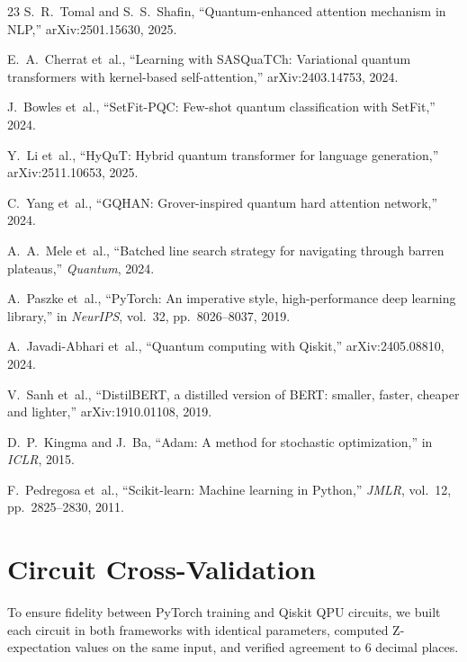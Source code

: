 \documentclass[conference,onecolumn,11pt]{IEEEtran}
\begin{document}
\begin{thebibliography}{23}
S.~R.~Tomal and S.~S.~Shafin, ``Quantum-enhanced attention mechanism in NLP,'' arXiv:2501.15630, 2025.

E.~A.~Cherrat et~al., ``Learning with SASQuaTCh: Variational quantum transformers with kernel-based self-attention,'' arXiv:2403.14753, 2024.

J.~Bowles et~al., ``SetFit-PQC: Few-shot quantum classification with SetFit,'' 2024.

Y.~Li et~al., ``HyQuT: Hybrid quantum transformer for language generation,'' arXiv:2511.10653, 2025.

C.~Yang et~al., ``GQHAN: Grover-inspired quantum hard attention network,'' 2024.

A.~A.~Mele et~al., ``Batched line search strategy for navigating through barren plateaus,'' \emph{Quantum}, 2024.

A.~Paszke et~al., ``PyTorch: An imperative style, high-performance deep learning library,'' in \emph{NeurIPS}, vol.~32, pp.~8026--8037, 2019.

A.~Javadi-Abhari et~al., ``Quantum computing with Qiskit,'' arXiv:2405.08810, 2024.

V.~Sanh et~al., ``DistilBERT, a distilled version of BERT: smaller, faster, cheaper and lighter,'' arXiv:1910.01108, 2019.

D.~P.~Kingma and J.~Ba, ``Adam: A method for stochastic optimization,'' in \emph{ICLR}, 2015.

F.~Pedregosa et~al., ``Scikit-learn: Machine learning in Python,'' \emph{JMLR}, vol.~12, pp.~2825--2830, 2011.

\end{thebibliography}

\appendix

\section{Circuit Cross-Validation}
\label{app:crossval}

To ensure fidelity between PyTorch training and Qiskit QPU circuits, we built each circuit in both frameworks with identical parameters, computed Z-expectation values on the same input, and verified agreement to 6 decimal places.
\end{document}

